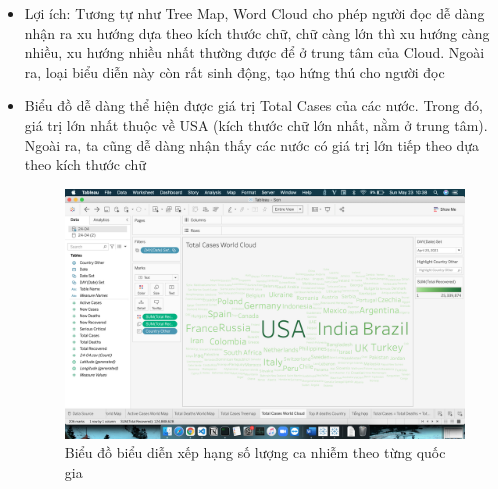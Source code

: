 \documentclass[a4paper, 12pt]{article}
\begin{document}
\begin{itemize}
    \item Lợi ích: Tương tự như Tree Map, Word Cloud cho phép người đọc dễ dàng nhận ra xu hướng dựa theo kích thước chữ, chữ càng lớn thì xu hướng càng nhiều, xu hướng nhiều nhất thường được để ở trung tâm của Cloud. Ngoài ra, loại biểu diễn này còn rất sinh động, tạo hứng thú cho người đọc
    \item Biểu đồ dễ dàng thể hiện được giá trị Total Cases của các nước. Trong đó, giá trị lớn nhất thuộc về USA (kích thước chữ lớn nhất, nằm ở trung tâm). Ngoài ra, ta cũng dễ dàng nhận thấy các nước có giá trị lớn tiếp theo dựa theo kích thước chữ
    \begin{figure}[H]
        \begin{center}
            \includegraphics[scale=0.4]{img/cloud.png}
            \caption{Biểu đồ biểu diễn xếp hạng số lượng ca nhiễm theo từng quốc gia}
        \end{center}
    \end{figure}
\end{itemize}
\end{document}
